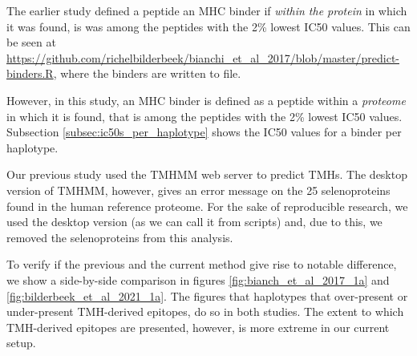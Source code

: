 
The earlier study defined a peptide an MHC binder 
if \emph{within the protein} in which it was found, 
is was among the peptides with the 2\% lowest IC50 values.
This can be seen at \url{https://github.com/richelbilderbeek/bianchi_et_al_2017/blob/master/predict-binders.R},
where the binders are written to file.

However, in this study, an MHC binder is defined as a peptide within a \emph{proteome} in which it is found, that is among the peptides with the 2\% lowest IC50 values.
Subsection \ref{subsec:ic50s_per_haplotype} shows the IC50 values
for a binder per haplotype. 


Our previous study used the TMHMM web server
to predict TMHs.
The desktop version of TMHMM, however, gives an
error message on the 25 selenoproteins found in the human
reference proteome.
For the sake of reproducible research, we used the desktop version (as
we can call it from scripts) and, due to this, we removed the
selenoproteins from this analysis.


To verify if the previous and the current method give rise to
notable difference, we show a side-by-side comparison
in figures \ref{fig:bianch_et_al_2017_1a} and \ref{fig:bilderbeek_et_al_2021_1a}.
The figures that haplotypes that over-present or under-present TMH-derived epitopes,
do so in both studies. The extent to which TMH-derived epitopes are
presented, however, is more extreme in our current setup.

